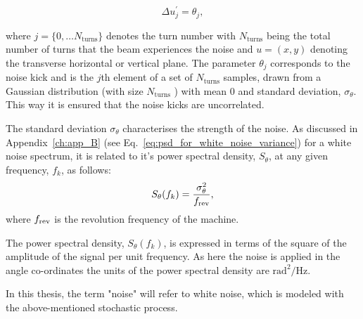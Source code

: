 \begin{equation}\label{eq:external_noise_kicks}
    \Delta u^\prime_{j} = \theta_j,
\end{equation}

where $j=\{ 0,\dots N_\mathrm{turns} \}$ denotes the turn number with $N_\mathrm{turns}$ being the total number of turns that the beam experiences the noise and $u=(x,y)$ denoting the transverse horizontal or vertical plane. The parameter $\theta_j$ corresponds to the noise kick and is the $j$th element of a set of $N_\mathrm{turns}$ samples, drawn from a Gaussian distribution (with size $N_\mathrm{turns}$ ) with mean 0 and standard deviation, $\sigma_\theta$. This way it is ensured that the noise kicks are uncorrelated.

The standard deviation $\sigma_\theta$ characterises the strength of the noise. As discussed in Appendix~\ref{ch:app_B} (see Eq.~\eqref{eq:psd_for_white_noise_variance}) for a white noise spectrum, it is related to it's power spectral density, $S_\theta$, at any given frequency, $f_k$, as follows: 
\begin{equation}\label{eq:psd_for_white_noise_variance_dipole}
    S_\theta(f_k) = \frac{\sigma_\theta^2 } {{f_\mathrm{rev}}},
 \end{equation}
where ${f_\mathrm{rev}}$ is the revolution frequency of the machine.

The power spectral density, $S_\theta(f_k)$, is expressed in terms of the square of the amplitude of the signal per unit frequency. As here the noise is applied in the angle co-ordinates the units of the power spectral density are $\mathrm{rad^2/Hz}$.

In this thesis, the term "noise" will refer to white noise, which is modeled with the above-mentioned stochastic process.



